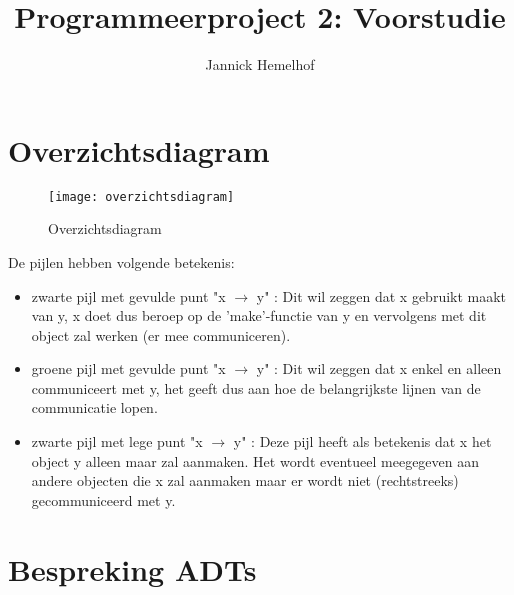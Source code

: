 \documentclass{article}
\title{Programmeerproject 2: Voorstudie}
\author{Jannick Hemelhof}
\begin{document}
\maketitle
\newpage
  \tableofcontents
\newpage
{}

\section{Overzichtsdiagram}

\begin{figure}[hb]%
  \centering
  \texttt{[image: overzichtsdiagram]}
  \caption{Overzichtsdiagram}
  \label{fig:test}
\end{figure}
De pijlen hebben volgende betekenis:
\begin{itemize}
  \item zwarte pijl met gevulde punt "x $\rightarrow$ y" : Dit wil zeggen dat x gebruikt maakt van y, x doet dus beroep op de 'make'-functie van y en vervolgens met dit object zal werken (er mee communiceren).
  \item groene pijl met gevulde punt "x $\rightarrow$ y" : Dit wil zeggen dat x enkel en alleen communiceert met y, het geeft dus aan hoe de belangrijkste lijnen van de communicatie lopen.
  \item zwarte pijl met lege punt "x $\rightarrow$ y" : Deze pijl heeft als betekenis dat x het object y alleen maar zal aanmaken. Het wordt eventueel meegegeven aan andere objecten die x zal aanmaken maar er wordt niet (rechtstreeks) gecommuniceerd met y.
\end{itemize}

\section{Bespreking ADTs}
\end{document}
